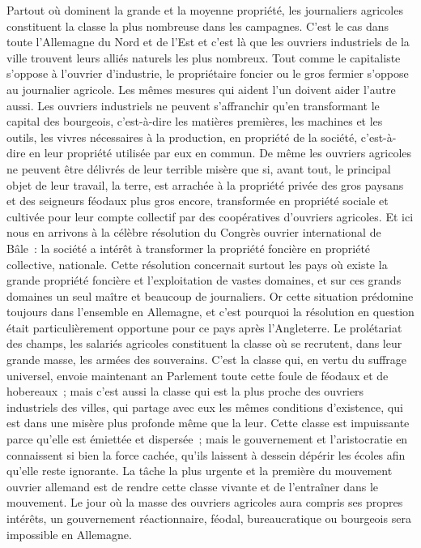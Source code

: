 \documentclass[french,twoside]{book} %
\begin{document}
Partout où dominent la grande et la moyenne propriété, les journaliers agricoles constituent la classe la plus nombreuse dans les campagnes. C’est le cas dans toute l’Allemagne du Nord et de l’Est et c’est là que les ouvriers industriels de la ville trouvent leurs alliés naturels les plus nombreux. Tout comme le capitaliste s’oppose à l’ouvrier d’industrie, le propriétaire foncier ou le gros fermier s’oppose au journalier agricole. Les mêmes mesures qui aident l’un doivent aider l’autre aussi. Les ouvriers industriels ne peuvent s’affranchir qu’en transformant le capital des bourgeois, c’est-à-dire les matières premières, les machines et les outils, les vivres nécessaires à la production, en propriété de la société, c’est-à-dire en leur propriété utilisée par eux en commun. De même les ouvriers agricoles ne peuvent être délivrés de leur terrible misère que si, avant tout, le principal objet de leur travail, la terre, est arrachée à la propriété privée des gros paysans et des seigneurs féodaux plus gros encore, transformée en propriété sociale et cultivée pour leur compte collectif par des coopératives d’ouvriers agricoles. Et ici nous en arrivons à la célèbre résolution du Congrès ouvrier international de Bâle : la société a intérêt à transformer la propriété foncière en propriété collective, nationale. Cette résolution concernait surtout les pays où existe la grande propriété foncière et l’exploitation de vastes domaines, et sur ces grands domaines un seul maître et beaucoup de journaliers. Or cette situation prédomine toujours dans l’ensemble en Allemagne, et c’est pourquoi la résolution en question était particulièrement opportune pour ce pays après l’Angleterre. Le prolétariat des champs, les salariés agricoles constituent la classe où se recrutent, dans leur grande masse, les armées des souverains. C’est la classe qui, en vertu du suffrage universel, envoie maintenant an Parlement toute cette foule de féodaux et de hobereaux ; mais c’est aussi la classe qui est la plus proche des ouvriers industriels des villes, qui partage avec eux les mêmes conditions d’existence, qui est dans une misère plus profonde même que la leur. Cette classe est impuissante parce qu’elle est émiettée et dispersée ; mais le gouvernement et l’aristocratie en connaissent si bien la force cachée, qu’ils laissent à dessein dépérir les écoles afin qu’elle reste ignorante. La tâche la plus urgente et la première du mouvement ouvrier allemand est de rendre cette classe vivante et de l’entraîner dans le mouvement. Le jour où la masse des ouvriers agricoles aura compris ses propres intérêts, un gouvernement réactionnaire, féodal, bureaucratique ou bourgeois sera impossible en Allemagne.
\end{document}
